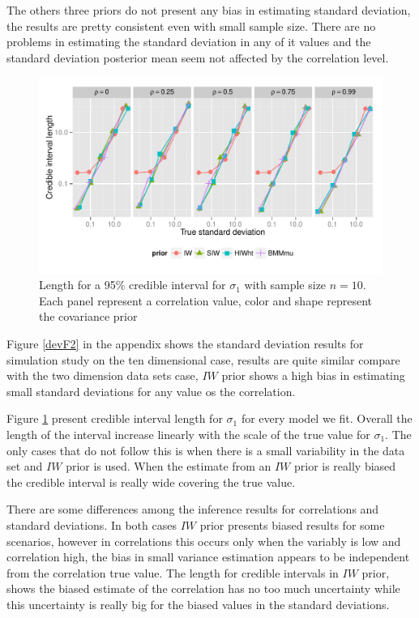 \documentclass{article}
\begin{document}
The others three priors do not present any bias in estimating standard deviation, the results are pretty consistent even with small sample size. There are no problems in estimating the standard deviation in any of it values and the standard deviation posterior mean seem not affected by the correlation level.  

\begin{figure}[htbp]
   \centering
   \includegraphics[width=\textwidth]{cilength_s1}
    \vspace{-.5in}
   \caption{Length for a 95\% credible interval for $\sigma_1$ with sample size $n=10$. Each panel represent a correlation value,  color and shape represent the covariance prior \label{devF3} }
\end{figure}
Figure \ref{devF2} in the appendix shows the standard deviation results for simulation study on the ten dimensional case, results are quite similar compare with the two dimension data sets case, $IW$ prior shows a high bias in estimating small standard deviations for any value os the correlation.  

Figure \ref{devF3} present credible interval length for $\sigma_1$ for every model we fit. Overall the length of the interval increase linearly with the scale of the true value for $\sigma_1$. The only cases that do not follow this is when there is a small variability in the data set and $IW$ prior is used. When the estimate from an $IW$  prior is really biased the credible interval is really wide covering the true value. 

There are some differences among the inference results for correlations and standard deviations. In both cases $IW$ prior presents biased results for some scenarios, however in correlations this occurs only when the variably is low and correlation high, the bias in small variance estimation appears to be independent from the correlation true value.  The length for credible intervals in $IW$ prior, shows the biased estimate of the correlation has no too much uncertainty while this uncertainty is really big for the biased values in the standard deviations. 
\end{document}
